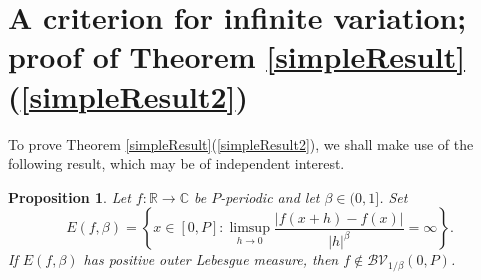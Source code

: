 \documentclass{amsart}
\newtheorem{prop}[theorem]{Proposition}
\numberwithin{equation}{section}
\begin{document}
\section{A criterion for infinite variation; proof of Theorem \ref{simpleResult}(\ref{simpleResult2})}
To prove Theorem \ref{simpleResult}(\ref{simpleResult2}), we shall make use of the following result, which may be of independent interest.
\begin{prop}
    \label{exceptional}
    Let $f:\mathbb{R}\rightarrow\mathbb{C}$ be $P$-periodic and let $\beta\in(0,1]$. Set
    \begin{equation}
        \nonumber
        E(f,\beta)=\left\{x\in[0,P]:\limsup_{h\rightarrow0}\frac{|f(x+h)-f(x)|}{|h|^\beta}=\infty\right\}.
    \end{equation}
    If $E(f,\beta)$ has positive outer Lebesgue measure, then $f\notin\mathcal{BV}_{1/\beta}(0,P)$.
\end{prop}
\end{document}
